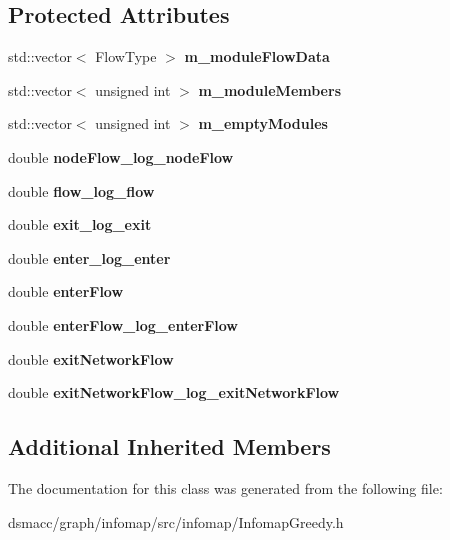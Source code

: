 \subsection*{Protected Attributes}
\begin{DoxyCompactItemize}
\item 
\mbox{\label{classInfomapGreedy_a052836aaf0028764e15fcd76db739ed9}} 
std\+::vector$<$ Flow\+Type $>$ {\bfseries m\+\_\+module\+Flow\+Data}
\item 
\mbox{\label{classInfomapGreedy_a7c76d10f30540fce14025bb77bf41322}} 
std\+::vector$<$ unsigned int $>$ {\bfseries m\+\_\+module\+Members}
\item 
\mbox{\label{classInfomapGreedy_a9d40eaa16a290b50838d39c387cd4070}} 
std\+::vector$<$ unsigned int $>$ {\bfseries m\+\_\+empty\+Modules}
\item 
\mbox{\label{classInfomapGreedy_ade6d21317f10d6aa8d5f56ccd964e6c4}} 
double {\bfseries node\+Flow\+\_\+log\+\_\+node\+Flow}
\item 
\mbox{\label{classInfomapGreedy_a26265300752e6b42f4af59b9d69832f3}} 
double {\bfseries flow\+\_\+log\+\_\+flow}
\item 
\mbox{\label{classInfomapGreedy_a79a94c676b1242614833c14dc1e24dd7}} 
double {\bfseries exit\+\_\+log\+\_\+exit}
\item 
\mbox{\label{classInfomapGreedy_a87dfb511c2468b75f0ff100ad0a230c8}} 
double {\bfseries enter\+\_\+log\+\_\+enter}
\item 
\mbox{\label{classInfomapGreedy_aac25a9968e64d1de82b2ebbc751b1215}} 
double {\bfseries enter\+Flow}
\item 
\mbox{\label{classInfomapGreedy_a1ac6dc942e2854f92ae50bdfb4e0e636}} 
double {\bfseries enter\+Flow\+\_\+log\+\_\+enter\+Flow}
\item 
\mbox{\label{classInfomapGreedy_acba5802ba37d9ec690af9ed646af9068}} 
double {\bfseries exit\+Network\+Flow}
\item 
\mbox{\label{classInfomapGreedy_a09851fa2fe22cd6f1081884e2c40fd32}} 
double {\bfseries exit\+Network\+Flow\+\_\+log\+\_\+exit\+Network\+Flow}
\end{DoxyCompactItemize}
\subsection*{Additional Inherited Members}


The documentation for this class was generated from the following file\+:\begin{DoxyCompactItemize}
\item 
dsmacc/graph/infomap/src/infomap/Infomap\+Greedy.\+h\end{DoxyCompactItemize}
